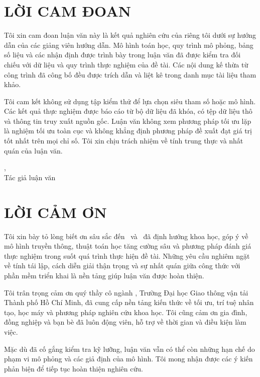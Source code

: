 \clearpage
\chapter*{LỜI CAM ĐOAN}
Tôi xin cam đoan luận văn này là kết quả nghiên cứu của riêng tôi dưới sự hướng dẫn của các giảng viên hướng dẫn. Mô hình toán học, quy trình mô phỏng, bảng số liệu và các nhận định được trình bày trong luận văn đã được kiểm tra đối chiếu với dữ liệu và quy trình thực nghiệm của đề tài. Các nội dung kế thừa từ công trình đã công bố đều được trích dẫn và liệt kê trong danh mục tài liệu tham khảo.

Tôi cam kết không sử dụng tập kiểm thử để lựa chọn siêu tham số hoặc mô hình. Các kết quả thực nghiệm được báo cáo từ bộ dữ liệu đã khóa, có tệp dữ liệu thô và thông tin truy xuất nguồn gốc. Luận văn không xem phương pháp tối ưu lặp là nghiệm tối ưu toàn cục và không khẳng định phương pháp đề xuất đạt giá trị tốt nhất trên mọi chỉ số. Tôi xin chịu trách nhiệm về tính trung thực và nhất quán của luận văn.

\vspace{1.2cm}
\begin{flushright}
\CompletionPlace, \CommitmentDate\\
Tác giả luận văn\\[2.2cm]
\AuthorName
\end{flushright}

\clearpage
\chapter*{LỜI CẢM ƠN}
Tôi xin bày tỏ lòng biết ơn sâu sắc đến \SupervisorOne\ và \SupervisorTwo\ đã định hướng khoa học, góp ý về mô hình truyền thông, thuật toán học tăng cường sâu và phương pháp đánh giá thực nghiệm trong suốt quá trình thực hiện đề tài. Những yêu cầu nghiêm ngặt về tính tái lập, cách diễn giải thận trọng và sự nhất quán giữa công thức với phần mềm triển khai là nền tảng giúp luận văn được hoàn thiện.

Tôi trân trọng cảm ơn quý thầy cô ngành \MajorName, Trường Đại học Giao thông vận tải Thành phố Hồ Chí Minh, đã cung cấp nền tảng kiến thức về tối ưu, trí tuệ nhân tạo, học máy và phương pháp nghiên cứu khoa học. Tôi cũng cảm ơn gia đình, đồng nghiệp và bạn bè đã luôn động viên, hỗ trợ về thời gian và điều kiện làm việc.

Mặc dù đã cố gắng kiểm tra kỹ lưỡng, luận văn vẫn có thể còn những hạn chế do phạm vi mô phỏng và các giả định của mô hình. Tôi mong nhận được các ý kiến phản biện để tiếp tục hoàn thiện nghiên cứu.

